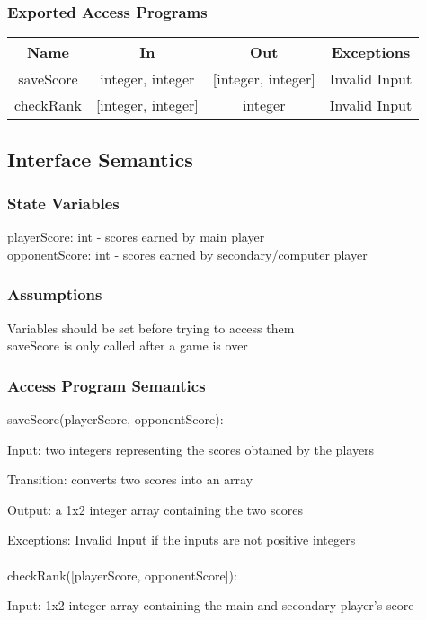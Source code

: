 \documentclass[12pt, titlepage]{article}
\begin{document}
		\subsubsection{Exported Access Programs}
		\begin{tabular}[pos]{|c|c|c|c|}
			\hline
			\textbf{Name}& \textbf{In} & \textbf{Out} & \textbf{Exceptions} \\ \hline
			saveScore & integer, integer & [integer, integer] & Invalid Input \\ \hline
			checkRank & [integer, integer] & integer & Invalid Input \\ \hline
		\end{tabular}
		
		\subsection{Interface Semantics}
		\subsubsection{State Variables}
		playerScore: int - scores earned by main player \\
		opponentScore: int - scores earned by secondary/computer player
		
		\subsubsection{Assumptions}
		Variables should be set before trying to access them \\
		saveScore is only called after a game is over
		
		\subsubsection{Access Program Semantics}
		saveScore(playerScore, opponentScore):
		
		Input: two integers representing the scores obtained by the players
		
		Transition: converts two scores into an array
		
		Output: a 1x2 integer array containing the two scores
		
		Exceptions: Invalid Input if the inputs are not positive integers \\
		\\
		checkRank([playerScore, opponentScore]):
		
		Input: 1x2 integer array containing the main and secondary player's score
		
\end{document}
